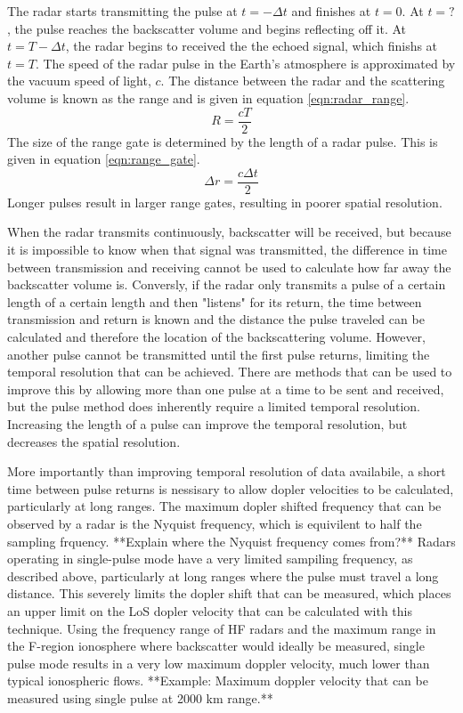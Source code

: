 The radar starts transmitting the pulse at \(t=-\Delta t\) and finishes at \(t=0\).  At \(t=?\), the pulse reaches the backscatter volume and begins reflecting off it.  At \(t=T-\Delta t\), the radar begins to received the the echoed signal, which finishs at \(t=T\).  The speed of the radar pulse in the Earth's atmosphere is approximated by the vacuum speed of light, \(c\).  The distance between the radar and the scattering volume is known as the range and is given in equation \ref{eqn:radar_range}.
\begin{equation}
	\label{eqn:radar_range}
	R = \frac{cT}{2}
\end{equation}
The size of the range gate is determined by the length of a radar pulse.  This is given in equation \ref{eqn:range_gate}.
\begin{equation}
	\label{eqn:range_gate}
	\Delta r = \frac{c\Delta t}{2}
\end{equation}
Longer pulses result in larger range gates, resulting in poorer spatial resolution.

When the radar transmits continuously, backscatter will be received, but because it is impossible to know when that signal was transmitted, the difference in time between transmission and receiving cannot be used to calculate how far away the backscatter volume is.  Conversly, if the radar only transmits a pulse of a certain length of a certain length and then "listens" for its return, the time between transmission and return is known and the distance the pulse traveled can be calculated and therefore the location of the backscattering volume.  However, another pulse cannot be transmitted until the first pulse returns, limiting the temporal resolution that can be achieved.  There are methods that can be used to improve this by allowing more than one pulse at a time to be sent and received, but the pulse method does inherently require a limited temporal resolution.  Increasing the length of a pulse can improve the temporal resolution, but decreases the spatial resolution.

More importantly than improving temporal resolution of data availabile, a short time between pulse returns is nessisary to allow dopler velocities to be calculated, particularly at long ranges.  The maximum dopler shifted frequency that can be observed by a radar is the Nyquist frequency, which is equivilent to half the sampling frquency.  **Explain where the Nyquist frequency comes from?**  Radars operating in single-pulse mode have a very limited sampiling frequency, as described above, particularly at long ranges where the pulse must travel a long distance.  This severely limits the dopler shift that can be measured, which places an upper limit on the LoS dopler velocity that can be calculated with this technique.  Using the frequency range of HF radars and the maximum range in the F-region ionosphere where backscatter would ideally be measured, single pulse mode results in a very low maximum doppler velocity, much lower than typical ionospheric flows.  **Example: Maximum doppler velocity that can be measured using single pulse at 2000 km range.**

